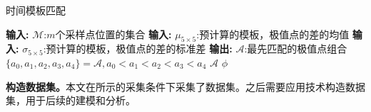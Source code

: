 {{	\begin{algorithm}[!h]
		\caption{时间模板匹配}\label{alg:checkdelta}
		\begin{algorithmic}[1]
			\Statex \textbf{输入:} $\mathcal M$:$m$个采样点位置的集合
			\Statex \textbf{输入:} $\mu_{5\times5}$:预计算的模板，极值点的差的均值
			\Statex \textbf{输入:} $\sigma_{5\times5}$:预计算的模板，极值点的差的标准差
			\Statex \textbf{输出:} $\mathcal A$:最先匹配的极值点组合
			\State $\{a_0,a_1,a_2,a_3,a_4\}=\mathcal A,a_0<a_1<a_2<a_3<a_4$
			\State \Return $\mathcal A$
			\EndIf
			\EndIf
			\EndFor
			\State \Return $\phi$
		\end{algorithmic}
	\end{algorithm}
	
	
	\textbf{构造数据集。}本文在所示的采集条件下采集了数据集。之后需要应用\yuchuli 技术构造数据集，用于后续的建模和分析。%
	
}}

